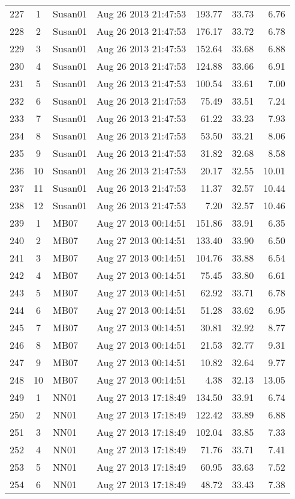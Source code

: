 \begin{longtable}{ccllrrr}
\hline 
227&1&Susan01&Aug 26 2013 21:47:53&193.77&33.73&6.76\\
228&2&Susan01&Aug 26 2013 21:47:53&176.17&33.72&6.78\\
229&3&Susan01&Aug 26 2013 21:47:53&152.64&33.68&6.88\\
230&4&Susan01&Aug 26 2013 21:47:53&124.88&33.66&6.91\\
231&5&Susan01&Aug 26 2013 21:47:53&100.54&33.61&7.00\\
232&6&Susan01&Aug 26 2013 21:47:53&75.49&33.51&7.24\\
233&7&Susan01&Aug 26 2013 21:47:53&61.22&33.23&7.93\\
234&8&Susan01&Aug 26 2013 21:47:53&53.50&33.21&8.06\\
235&9&Susan01&Aug 26 2013 21:47:53&31.82&32.68&8.58\\
236&10&Susan01&Aug 26 2013 21:47:53&20.17&32.55&10.01\\
237&11&Susan01&Aug 26 2013 21:47:53&11.37&32.57&10.44\\
238&12&Susan01&Aug 26 2013 21:47:53&7.20&32.57&10.46\\
\hline 
239&1&MB07&Aug 27 2013 00:14:51&151.86&33.91&6.35\\
240&2&MB07&Aug 27 2013 00:14:51&133.40&33.90&6.50\\
241&3&MB07&Aug 27 2013 00:14:51&104.76&33.88&6.54\\
242&4&MB07&Aug 27 2013 00:14:51&75.45&33.80&6.61\\
243&5&MB07&Aug 27 2013 00:14:51&62.92&33.71&6.78\\
244&6&MB07&Aug 27 2013 00:14:51&51.28&33.62&6.95\\
245&7&MB07&Aug 27 2013 00:14:51&30.81&32.92&8.77\\
246&8&MB07&Aug 27 2013 00:14:51&21.53&32.77&9.31\\
247&9&MB07&Aug 27 2013 00:14:51&10.82&32.64&9.77\\
248&10&MB07&Aug 27 2013 00:14:51&4.38&32.13&13.05\\
\hline 
249&1&NN01&Aug 27 2013 17:18:49&134.50&33.91&6.74\\
250&2&NN01&Aug 27 2013 17:18:49&122.42&33.89&6.88\\
251&3&NN01&Aug 27 2013 17:18:49&102.04&33.85&7.33\\
252&4&NN01&Aug 27 2013 17:18:49&71.76&33.71&7.41\\
253&5&NN01&Aug 27 2013 17:18:49&60.95&33.63&7.52\\
254&6&NN01&Aug 27 2013 17:18:49&48.72&33.43&7.38\\

\end{longtable}
